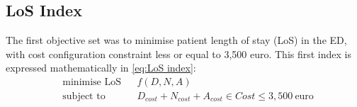 \subsection{LoS Index}

The first objective set was to minimise patient length of stay (LoS)
in the ED, with cost configuration constraint less or equal to 3,500
euro. This first index is expressed mathematically in \ref{eq:LoS index}:
\begin{equation}
\begin{aligned} & {\text{minimise LoS}} &  & f(D,N,A)\\
 & \text{subject to} &  & D_{cost}+N_{cost}+A_{cost}\in Cost\leq3,500\:\text{euro}
\end{aligned}
\label{eq:LoS index}
\end{equation}


